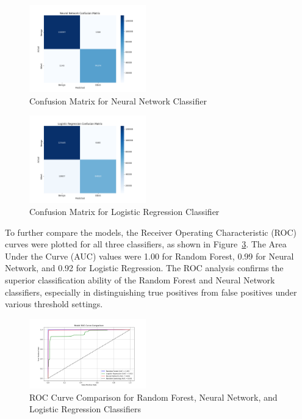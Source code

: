 \documentclass[conference]{IEEEtran}
\begin{document}
\begin{figure}[htbp]
\centerline{\includegraphics[width=0.45\textwidth]{Neural_Network_CM.png}}
\caption{Confusion Matrix for Neural Network Classifier}
\label{fig:nn_confusion}
\end{figure}

\begin{figure}[htbp]
\centerline{\includegraphics[width=0.45\textwidth]{Logistic_Regression_CM.png}}
\caption{Confusion Matrix for Logistic Regression Classifier}
\label{fig:lr_confusion}
\end{figure}

To further compare the models, the Receiver Operating Characteristic (ROC) curves were plotted for all three classifiers, as shown in Figure~\ref{fig:roc_curve}. The Area Under the Curve (AUC) values were 1.00 for Random Forest, 0.99 for Neural Network, and 0.92 for Logistic Regression. The ROC analysis confirms the superior classification ability of the Random Forest and Neural Network classifiers, especially in distinguishing true positives from false positives under various threshold settings.

\begin{figure}[htbp]
\centerline{\includegraphics[width=0.45\textwidth]{ROC_Comparison.png}}
\caption{ROC Curve Comparison for Random Forest, Neural Network, and Logistic Regression Classifiers}
\label{fig:roc_curve}
\end{figure}
\end{document}
